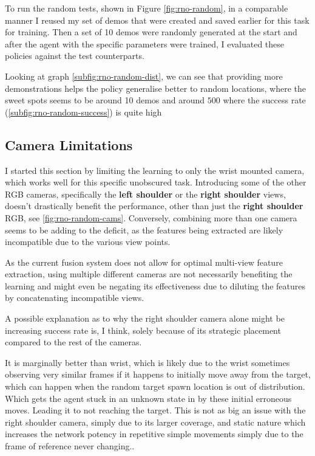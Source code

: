 To run the random tests, shown in Figure \ref{fig:rno-random}, in a comparable manner I reused my set of demos that were created and saved earlier for this task for training. Then a set of 10 demos were randomly generated at the start and after the agent with the specific parameters were trained, I evaluated these policies against the test counterparts.

Looking at graph \ref{subfig:rno-random-dist}, we can see that providing more demonstrations helps the policy generalise better to random locations, where the sweet spots seems to be around 10 demos and around $500$ where the success rate (\ref{subfig:rno-random-success}) is quite high

\subsection{Camera Limitations}
I started this section by limiting the learning to only the wrist mounted camera, which works well for this specific unobscured task. Introducing some of the other RGB cameras, specifically the \textbf{left shoulder} or the \textbf{right shoulder} views, doesn't drastically benefit the performance, other than just the \textbf{right shoulder} RGB, see \ref{fig:rno-random-cams}. Conversely, combining more than one camera seems to be adding to the deficit, as the features being extracted are likely incompatible due to the various view points. 

As the current fusion system does not allow for optimal multi-view feature extraction, using multiple different cameras are not necessarily benefiting the learning and might even be negating its effectiveness due to diluting the features by concatenating incompatible views.  

A possible explanation as to why the right shoulder camera alone might be increasing success rate is, I think, solely because of its strategic placement compared to the rest of the cameras. 

It is marginally better than wrist, which is likely due to the wrist sometimes observing very similar frames if it happens to initially move away from the target, which can happen when the random target spawn location is out of distribution. Which gets the agent stuck in an unknown state in by these initial erroneous moves. Leading it to not reaching the target. This is not as big an issue with the right shoulder camera, simply due to its larger coverage, and static nature which increases the network potency in repetitive simple movements simply due to the frame of reference never changing.\todo[color=purple]{}. 

